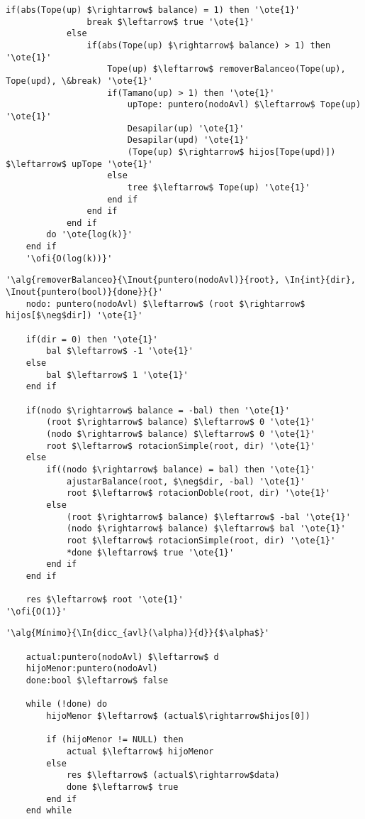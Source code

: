 \begin{lstlisting}[mathescape]
			if(abs(Tope(up) $\rightarrow$ balance) = 1) then '\ote{1}'
				break $\leftarrow$ true '\ote{1}'
			else
				if(abs(Tope(up) $\rightarrow$ balance) > 1) then '\ote{1}'
					Tope(up) $\leftarrow$ removerBalanceo(Tope(up), Tope(upd), \&break) '\ote{1}'
					if(Tamano(up) > 1) then '\ote{1}'
						upTope: puntero(nodoAvl) $\leftarrow$ Tope(up) '\ote{1}'
						Desapilar(up) '\ote{1}'
						Desapilar(upd) '\ote{1}'
						(Tope(up) $\rightarrow$ hijos[Tope(upd)]) $\leftarrow$ upTope '\ote{1}'
					else
						tree $\leftarrow$ Tope(up) '\ote{1}'
					end if
				end if
			end if
		do '\ote{log(k)}'
	end if
	'\ofi{O(log(k))}'
\end{lstlisting}

\begin{lstlisting}[mathescape]
'\alg{removerBalanceo}{\Inout{puntero(nodoAvl)}{root}, \In{int}{dir}, \Inout{puntero(bool)}{done}}{}'
	nodo: puntero(nodoAvl) $\leftarrow$ (root $\rightarrow$ hijos[$\neg$dir]) '\ote{1}'
	
	if(dir = 0) then '\ote{1}'
		bal $\leftarrow$ -1 '\ote{1}'
	else
		bal $\leftarrow$ 1 '\ote{1}'
	end if
	
	if(nodo $\rightarrow$ balance = -bal) then '\ote{1}'
		(root $\rightarrow$ balance) $\leftarrow$ 0 '\ote{1}'
		(nodo $\rightarrow$ balance) $\leftarrow$ 0 '\ote{1}'
		root $\leftarrow$ rotacionSimple(root, dir) '\ote{1}'
	else
		if((nodo $\rightarrow$ balance) = bal) then '\ote{1}'
			ajustarBalance(root, $\neg$dir, -bal) '\ote{1}'
			root $\leftarrow$ rotacionDoble(root, dir) '\ote{1}'
		else
			(root $\rightarrow$ balance) $\leftarrow$ -bal '\ote{1}'
			(nodo $\rightarrow$ balance) $\leftarrow$ bal '\ote{1}'
			root $\leftarrow$ rotacionSimple(root, dir) '\ote{1}'
			*done $\leftarrow$ true '\ote{1}'
		end if
	end if

	res $\leftarrow$ root '\ote{1}'
'\ofi{O(1)}'
\end{lstlisting}

\begin{lstlisting}[mathescape]
'\alg{Mínimo}{\In{dicc_{avl}(\alpha)}{d}}{$\alpha$}'

	actual:puntero(nodoAvl) $\leftarrow$ d
	hijoMenor:puntero(nodoAvl)
	done:bool $\leftarrow$ false

	while (!done) do
		hijoMenor $\leftarrow$ (actual$\rightarrow$hijos[0])

		if (hijoMenor != NULL) then
			actual $\leftarrow$ hijoMenor
		else
			res $\leftarrow$ (actual$\rightarrow$data)
			done $\leftarrow$ true
		end if
	end while
\end{lstlisting}

